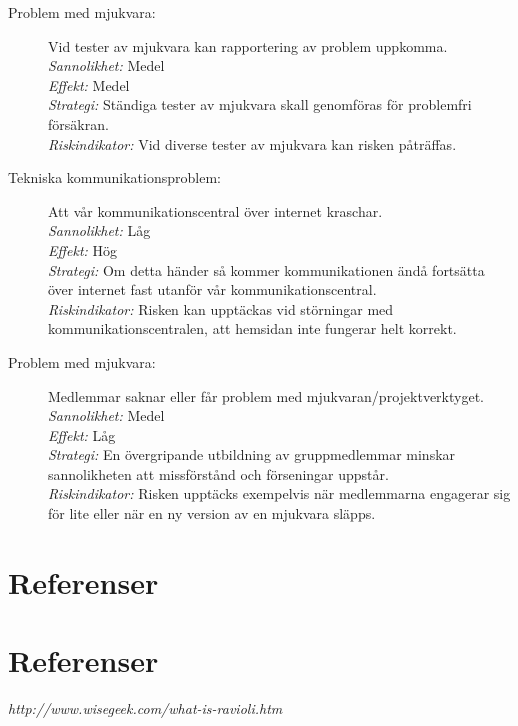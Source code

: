 \documentclass[a4paper]{article}
\begin{document}
\begin{description}
\item[Problem med mjukvara:]
Vid tester av mjukvara kan rapportering av problem uppkomma. \\
\emph{Sannolikhet:}
Medel \\
\emph{Effekt:}
Medel \\
\emph{Strategi:}
Ständiga tester av mjukvara skall genomföras för problemfri försäkran. \\
\emph{Riskindikator:}
Vid diverse tester av mjukvara kan risken påträffas.

\item[Tekniska kommunikationsproblem:]
Att vår kommunikationscentral över internet kraschar. \\
\emph{Sannolikhet:}
Låg \\
\emph{Effekt:}
Hög \\
\emph{Strategi:}
Om detta händer så kommer kommunikationen ändå fortsätta över internet fast
 utanför vår kommunikationscentral. \\
\emph{Riskindikator:}
Risken kan upptäckas vid störningar med kommunikationscentralen, att hemsidan
 inte fungerar helt korrekt.
 
 \item[Problem med mjukvara:]
Medlemmar saknar eller får problem med mjukvaran/projektverktyget. \\
\emph{Sannolikhet:}
Medel \\
\emph{Effekt:}
Låg \\
\emph{Strategi:}
En övergripande utbildning av gruppmedlemmar minskar sannolikheten att missförstånd och förseningar uppstår. \\
\emph{Riskindikator:}
Risken upptäcks exempelvis när medlemmarna engagerar sig för lite eller när en ny version av en mjukvara släpps.
\end{description}
\section{Referenser}
\section{Referenser}
\renewcommand*{\refname}{}
\vspace{-1cm} %

\begin{thebibliography}{99}
 \emph{http://www.wisegeek.com/what-is-ravioli.htm}
\end{thebibliography}
\end{document}
